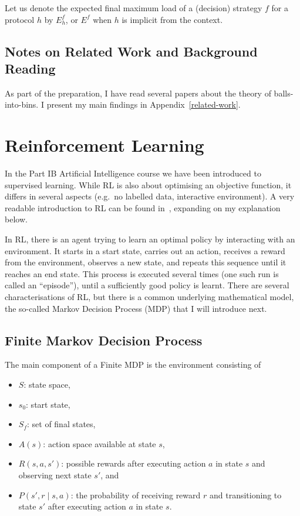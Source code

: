 \begin{definition} 
Let us denote the expected final maximum load of a (decision) strategy $f$ for a protocol $h$ by $E^f_h$, or $E^f$ when $h$ is implicit from the context.
\end{definition}



\subsection{Notes on Related Work and Background Reading}

As part of the preparation, I have read several papers about the theory of balls-into-bins. I present my main findings in Appendix~\ref{related-work}.



\section{Reinforcement Learning} \label{RLintro}


In the Part IB Artificial Intelligence course we have been introduced to supervised learning. While RL is also about optimising an objective function, it differs in several aspects (e.g.\ no labelled data, interactive environment). A very readable introduction to RL can be found in~\cite{sutton2018RLbook}, expanding on my explanation below.


In RL, there is an agent trying to learn an optimal policy by interacting with an environment. It starts in a start state, carries out an action, receives a reward from the environment, observes a new state, and repeats this sequence until it reaches an end state. This process is executed several times (one such run is called an ``episode''), until a sufficiently good policy is learnt. There are several characterisations of RL, but there is a common underlying mathematical model, the so-called Markov Decision Process (MDP) that I will introduce next.

\subsection{Finite Markov Decision Process}


The main component of a Finite MDP is the environment consisting of
\begin{itemize}[itemsep=0pt]
    \item $S$: state space,
    \item $s_0$: start state,
    \item $S_f$: set of final states,
    \item $A(s)$: action space available at state $s$,
    \item $R(s, a, s')$: possible rewards after executing action $a$ in state $s$ and observing next state $s'$, and
    \item $P(s', r \mid s, a)$: the probability of receiving reward $r$ and transitioning to state $s'$ after executing action $a$ in state $s$.
\end{itemize} 


